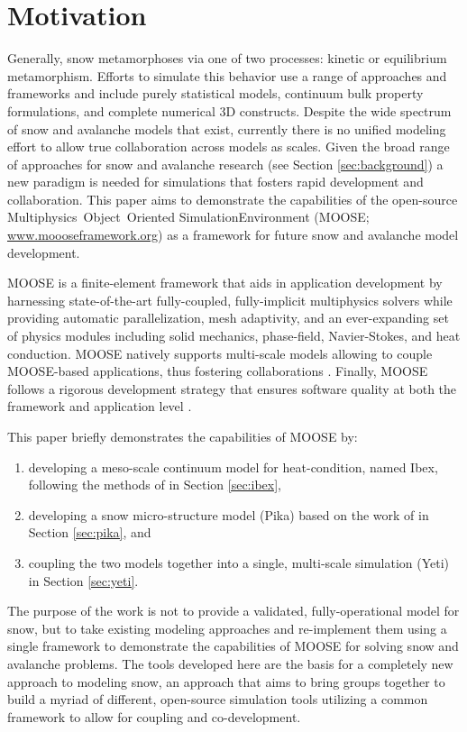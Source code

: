 \section{Motivation}\label{sec:motivation}
Generally, snow metamorphoses via one of two processes: kinetic or equilibrium metamorphism. Efforts to simulate this behavior use a range of approaches and frameworks and include purely statistical models, continuum bulk property formulations, and complete numerical 3D constructs. Despite the wide spectrum of snow and avalanche models that exist, currently there is no unified modeling effort to allow true collaboration across models as scales. Given the broad range of approaches for snow and avalanche research (see Section \ref{sec:background}) a new paradigm is needed for simulations that fosters rapid development and collaboration. This paper aims to demonstrate the capabilities of the open-source Multiphysics\, Object\, Oriented Simulation\authorcorrespond \noindent Environment (MOOSE; \url{www.moooseframework.org})  as a framework for future snow and avalanche model development.

MOOSE is a finite-element framework that aids in application development by harnessing state-of-the-art fully-coupled, fully-implicit multiphysics solvers while providing automatic parallelization, mesh adaptivity, and an ever-expanding set of physics modules including solid mechanics, phase-field, Navier-Stokes, and heat conduction. MOOSE natively supports multi-scale models allowing to couple MOOSE-based applications, thus fostering collaborations \citep{gaston2014physics}. Finally, MOOSE follows a rigorous development strategy that ensures software quality at both the framework and application level \citep{gaston2014continous}.

This paper briefly demonstrates the capabilities of MOOSE by:
\begin{enumerate}\setlength{\itemsep}{0pt}
\item developing a meso-scale continuum model for heat-condition, named Ibex, following the methods of \citet{slaughter2010numerical} in Section \ref{sec:ibex},
\item developing a snow micro-structure model (Pika) based on the work of \citet{kaempfer2009phase} in Section \ref{sec:pika}, and
\item coupling the two models together into a single, multi-scale simulation (Yeti) in Section \ref{sec:yeti}.
\end{enumerate}

The purpose of the work is not to provide a validated, fully-operational model for snow, but to take existing modeling approaches and re-implement them using a single framework to demonstrate the capabilities of MOOSE for solving snow and avalanche problems. The tools developed here are the basis for a completely new approach to modeling snow, an approach that aims to bring groups together to build a myriad of different, open-source simulation tools utilizing a common framework to allow for coupling and co-development.


